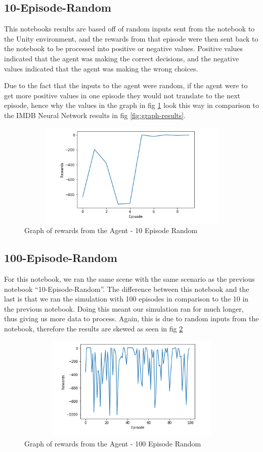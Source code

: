 \begin{itemize}
\subsection{10-Episode-Random}
This notebooks results are based off of random inputs sent from the notebook to the Unity environment, and the rewards from that episode were then sent back to the notebook to be processed into positive or negative values. Positive values indicated that the agent was making the correct decisions, and the negative values indicated that the agent was making the wrong choices. 

Due to the fact that the inputs to the agent were random, if the agent were to get more positive values in one episode they would not translate to the next episode, hence why the values in the graph in fig \ref{fig:10EpResults} look this way in comparison to the IMDB Neural Network results in fig \ref{fig:graph-results}.

\begin{figure}[H]
    \centering
    \includegraphics[width=120mm, height=50mm]{img/random10results.PNG}
    \caption{Graph of rewards from the Agent - 10 Episode Random}
    \label{fig:10EpResults}
\end{figure}

\subsection{100-Episode-Random}
For this notebook, we ran the same scene with the same scenario as the previous notebook “10-Episode-Random”. The difference between this notebook and the last is that we ran the simulation with 100 episodes in comparison to the 10 in the previous notebook. Doing this meant our simulation ran for much longer, thus giving us more data to process. Again, this is due to random inputs from the notebook, therefore the results are skewed as seen in fig \ref{fig:100EpResults}

\begin{figure}[H]
    \centering
    \includegraphics[width=120mm, height=50mm]{img/Large100Episode.PNG}
    \caption{Graph of rewards from the Agent - 100 Episode Random}
    \label{fig:100EpResults}
\end{figure}


\end{itemize}
